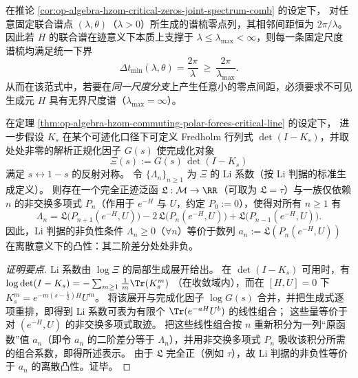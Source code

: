 \begin{corollary}\label{cor:op-algebra-hzom-zero-spacing-scale-lower-bound}
在推论 \ref{cor:op-algebra-hzom-critical-zeros-joint-spectrum-comb} 的设定下，
对任意固定联合谱点 \((\lambda,\theta)\)（\(\lambda>0\)）所生成的谱梳零点列，其相邻间距恒为 \(2\pi/\lambda\)。
因此若 \(H\) 的联合谱在迹意义下本质上支撑于 \(\lambda\le \lambda_{\max}<\infty\)，则每一条固定尺度谱梳均满足统一下界
\[
\boxed{\ \Delta t_{\min}(\lambda,\theta)=\frac{2\pi}{\lambda}\ \ge\ \frac{2\pi}{\lambda_{\max}}.\ }
\]
从而在该范式中，若要在\emph{同一尺度分支}上产生任意小的零点间距，必须要求不可见生成元 \(H\) 具有无界尺度谱（\(\lambda_{\max}=\infty\)）。
\end{corollary}

\begin{proposition}\label{prop:op-algebra-li-criterion-operatorized}
在定理 \ref{thm:op-algebra-hzom-commuting-polar-forces-critical-line} 的设定下，
进一步假设 \(K_s\) 在某个可迹化口径下可定义 Fredholm 行列式 \(\det(I-K_s)\)，并取处处非零的解析正规化因子 \(G(s)\) 使完成化对象
\[
\Xi(s):=G(s)\,\det(I-K_s)
\]
满足 \(s\leftrightarrow 1-s\) 的反射对称。
令 \(\{\Lambda_n\}_{n\ge 1}\) 为 \(\Xi\) 的 Li 系数（按 Li 判据的标准生成定义）。
则存在一个完全正迹泛函 \(\mathfrak{L}:\mathcal{M}\to\RR\)（可取为 \(\mathfrak{L}=\tau\)）与一族仅依赖 \(n\) 的非交换多项式 \(P_n\)（作用于 \(e^{-H}\) 与 \(U\)，约定 \(P_0:=0\)），使得对所有 \(n\ge 1\) 有
\[
\boxed{\;
\Lambda_n
=\mathfrak{L}\!\bigl(P_{n+1}(e^{-H},U)\bigr)
-2\,\mathfrak{L}\!\bigl(P_{n}(e^{-H},U)\bigr)
+\mathfrak{L}\!\bigl(P_{n-1}(e^{-H},U)\bigr).\;}
\]
因此，Li 判据的非负性条件 \(\Lambda_n\ge 0\)（\(\forall n\)）等价于数列
\(
a_n:=\mathfrak{L}(P_n(e^{-H},U))
\)
在离散意义下的凸性：其二阶差分处处非负。
\end{proposition}
\begin{proof}[证明要点]
Li 系数由 \(\log \Xi\) 的局部生成展开给出。
在 \(\det(I-K_s)\) 可用时，有
\(
\log\det(I-K_s)=-\sum_{m\ge 1}\frac{1}{m}\Tr(K_s^m)
\)
（在收敛域内），而在 \([H,U]=0\) 下 \(K_s^m=e^{-m(s-\tfrac12)H}U^m\)。
将该展开与完成化因子 \(\log G(s)\) 合并，并把生成式逐项重排，即得到 Li 系数可表为有限个 \(\Tr(e^{-aH}U^b)\) 的线性组合；
这些量等价于对 \((e^{-H},U)\) 的非交换多项式取迹。
把这些线性组合按 \(n\) 重新积分为一列“原函数”值 \(a_n\)（即令 \(a_n\) 的二阶差分等于 \(\Lambda_n\)），并用非交换多项式 \(P_n\) 吸收该积分所需的组合系数，即得所述表示。
由于 \(\mathfrak{L}\) 完全正（例如 \(\tau\)），故 Li 判据的非负性等价于 \(a_n\) 的离散凸性。证毕。
\end{proof}

